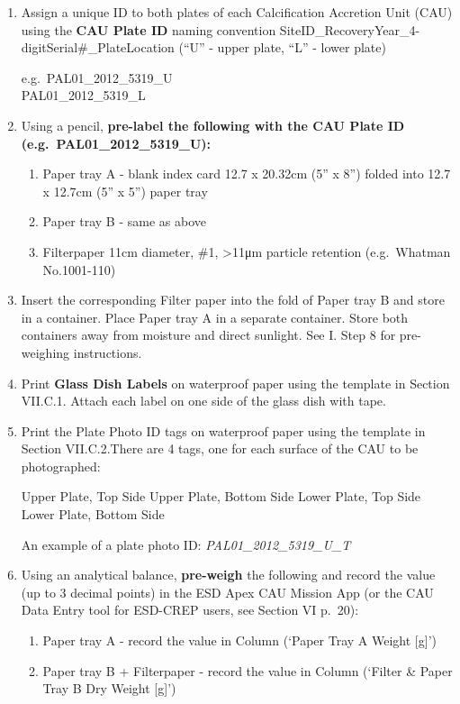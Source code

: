 \documentclass[]{book}
\providecommand{\tightlist}{%
  \setlength{\itemsep}{0pt}\setlength{\parskip}{0pt}}
\begin{document}
\begin{enumerate}
\def\labelenumi{\arabic{enumi}.}
\item
  Assign a unique ID to both plates of each Calcification Accretion Unit (CAU) using the \textbf{CAU Plate ID} naming convention SiteID\_RecoveryYear\_4-digitSerial\#\_PlateLocation (``U'' - upper plate, ``L'' - lower plate)

  e.g.~PAL01\_2012\_5319\_U\\
  PAL01\_2012\_5319\_L
\item
  Using a pencil, \textbf{pre-label the following with the CAU Plate ID (e.g.~PAL01\_2012\_5319\_U):}

  \begin{enumerate}
  \def\labelenumii{\alph{enumii})}
  \tightlist
  \item
    Paper tray A - blank index card 12.7 x 20.32cm (5'' x 8'') folded into 12.7 x 12.7cm (5'' x 5'') paper tray\\
  \item
    Paper tray B - same as above\\
  \item
    Filterpaper 11cm diameter, \#1, \textgreater11μm particle retention (e.g.~Whatman No.1001-110)
  \end{enumerate}
\item
  Insert the corresponding Filter paper into the fold of Paper tray B and store in a container. Place Paper tray A in a separate container. Store both containers away from moisture and direct sunlight. See I. Step 8 for pre-weighing instructions.
\item
  Print \textbf{Glass Dish Labels} on waterproof paper using the template in Section VII.C.1. Attach each label on one side of the glass dish with tape.
\item
  Print the Plate Photo ID tags on waterproof paper using the template in Section VII.C.2.There are 4 tags, one for each surface of the CAU to be photographed:

  Upper Plate, Top Side
  Upper Plate, Bottom Side
  Lower Plate, Top Side
  Lower Plate, Bottom Side

  An example of a plate photo ID: \emph{PAL01\_2012\_5319\_U\_T}
\item
  Using an analytical balance, \textbf{pre-weigh} the following and record the value (up to 3 decimal points) in the ESD Apex CAU Mission App (or the CAU Data Entry tool for ESD-CREP users, see Section VI p.~20):

  \begin{enumerate}
  \def\labelenumii{\alph{enumii})}
  \tightlist
  \item
    Paper tray A - record the value in Column (`Paper Tray A Weight {[}g{]}')\\
  \item
    Paper tray B + Filterpaper - record the value in Column (`Filter \& Paper Tray B Dry Weight {[}g{]}')
  \end{enumerate}
\end{enumerate}
\end{document}
